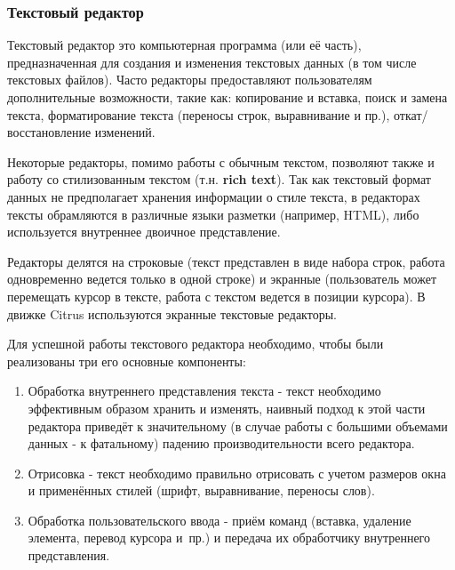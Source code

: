\documentclass{fefu}
\begin{document}
			\subsubsection{Текстовый редактор}
				\par Текстовый редактор это компьютерная программа (или её часть), 
				предназначенная для создания и изменения текстовых данных (в том числе 
				текстовых файлов). Часто редакторы предоставляют пользователям дополнительные 
				возможности, такие как: копирование и вставка, поиск и замена текста, 
				форматирование текста (переносы строк, выравнивание и пр.), 
				откат/восстановление изменений. 
				\par Некоторые редакторы, помимо работы с обычным текстом, позволяют также и
				работу со стилизованным текстом (т.н. \textbf{rich text}). Так как текстовый
				формат данных не предполагает хранения информации о стиле текста, в редакторах
				тексты обрамляются в различные языки разметки (например, HTML), либо
				используется внутреннее двоичное представление.
				\par Редакторы делятся на строковые (текст представлен в виде набора строк, 
				работа одновременно ведется только в одной строке) и экранные (пользователь
				может перемещать курсор в тексте, работа с текстом ведется в позиции курсора).
				В движке Citrus используются экранные текстовые редакторы.
				\par Для успешной работы текстового редактора необходимо, чтобы были
				реализованы три его основные компоненты: \cite{CraftOfTextEditing}
				\begin{enumerate}
					\item Обработка внутреннего представления текста - текст необходимо
					эффективным образом хранить и изменять, наивный подход к этой части
					редактора приведёт к значительному (в случае работы с большими объемами
					данных - к фатальному) падению производительности всего редактора.
					\item Отрисовка - текст необходимо правильно отрисовать с учетом размеров
					окна и применённых стилей (шрифт, выравнивание, переносы слов).
					\item Обработка пользовательского ввода - приём команд
					(вставка, удаление элемента, перевод курсора и~пр.) и передача их
					обработчику внутреннего представления.
				\end{enumerate}
\end{document}
